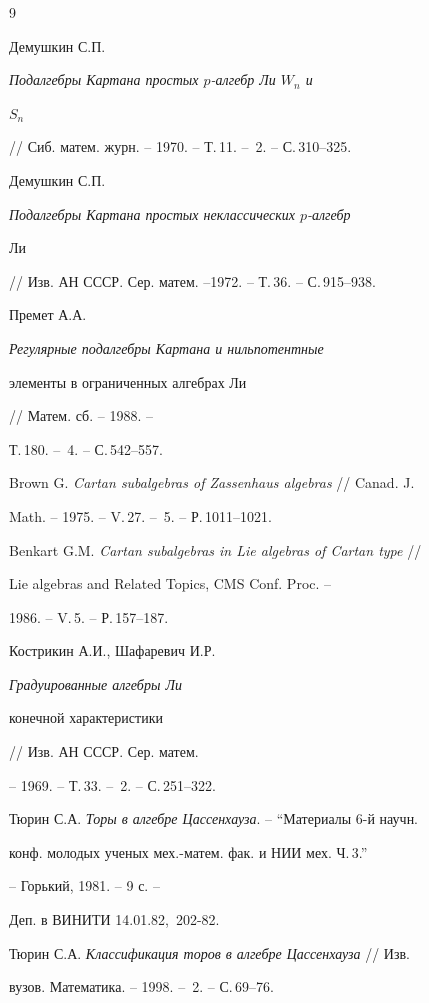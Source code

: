 \begin{thebibliography}{9} 


 




Демушкин С.П. {\em Подалгебры Картана простых $p$-алгебр Ли $W_n$ и 


$S_n$} 


// Сиб. матем. журн. -- 1970. -- Т.\,11. -- \No\,2. -- С.\,310--325. 




Демушкин С.П. {\em Подалгебры Картана простых неклассических $p$-алгебр 


Ли} // Изв. АН СССР. Сер. матем. --1972. -- Т.\,36. -- С.\,915--938. 




Премет А.А. {\em Регулярные подалгебры Картана и нильпотентные 


элементы в ограниченных алгебрах Ли} // Матем. сб. -- 1988. -- 


Т.\,180. -- \No\,4. -- С.\,542--557. 




Brown G. {\em Cartan subalgebras of Zassenhaus algebras} // Canad. J. 


Math. -- 1975. -- V.\,27. -- \No\,5. -- Р.\,1011--1021. 




Benkart G.M. {\em Cartan subalgebras in Lie algebras of Cartan type} // 


Lie algebras and Related Topics, CMS Conf. Proc. -- 


1986. -- V.\,5. -- Р.\,157--187. 




Кострикин А.И., Шафаревич И.Р. {\em Градуированные алгебры Ли 


конечной характеристики} // Изв. АН СССР. Сер. матем. 


-- 1969. -- Т.\,33. -- \No\,2. -- С.\,251--322. 




Тюрин С.А. {\em Торы в алгебре Цассенхауза}. -- ``Материалы 6-й научн. 


конф. молодых ученых мех.-матем. фак. и НИИ мех. Ч.\,3.'' 


-- Горький, 1981. -- 9 с. -- 


Деп. в ВИНИТИ 14.01.82, \No\,202-82. 




Тюрин С.А. {\em Классификация торов в алгебре Цассенхауза} // Изв. 


вузов. Математика. -- 1998. -- \No\,2. -- С.\,69--76. 


 


 


\end{thebibliography} 


 


\vskip 2cm 


 






 


\label{end} 


 


